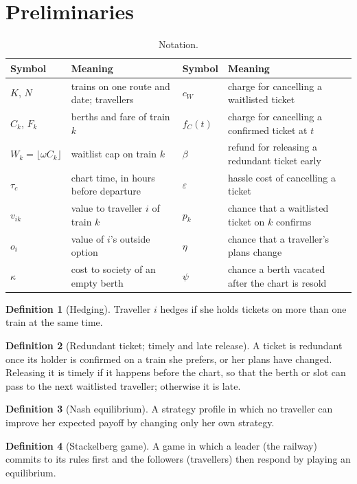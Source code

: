 \documentclass{article}
\theoremstyle{definition}
\newtheorem{definition}{Definition}
\begin{document}
\section{Preliminaries}

\begin{table}[ht]
\caption{Notation.}
\label{tab:notation}
\centering
\small
\begin{tabular}{ll@{\hspace{2em}}ll}
\toprule
Symbol & Meaning & Symbol & Meaning \\
\midrule
$K$, $N$ & trains on one route and date; travellers & $c_W$ & charge for cancelling a waitlisted ticket \\
$C_k$, $F_k$ & berths and fare of train $k$ & $f_C(t)$ & charge for cancelling a confirmed ticket at $t$ \\
$W_k=\lfloor\omega C_k\rfloor$ & waitlist cap on train $k$ & $\beta$ & refund for releasing a redundant ticket early \\
$\tau_c$ & chart time, in hours before departure & $\varepsilon$ & hassle cost of cancelling a ticket \\
$v_{ik}$ & value to traveller $i$ of train $k$ & $p_k$ & chance that a waitlisted ticket on $k$ confirms \\
$o_i$ & value of $i$'s outside option & $\eta$ & chance that a traveller's plans change \\
$\kappa$ & cost to society of an empty berth & $\psi$ & chance a berth vacated after the chart is resold \\
\bottomrule
\end{tabular}
\end{table}

\begin{definition}[Hedging] Traveller $i$ hedges if she holds tickets on more than one
train at the same time.\end{definition}
\begin{definition}[Redundant ticket; timely and late release] A ticket is redundant once
its holder is confirmed on a train she prefers, or her plans have changed. Releasing it is
timely if it happens before the chart, so that the berth or slot can pass to the next
waitlisted traveller; otherwise it is late.\end{definition}
\begin{definition}[Nash equilibrium] A strategy profile in which no traveller can improve
her expected payoff by changing only her own strategy.\end{definition}
\begin{definition}[Stackelberg game] A game in which a leader (the railway) commits to
its rules first and the followers (travellers) then respond by playing an
equilibrium.\end{definition}
\end{document}
